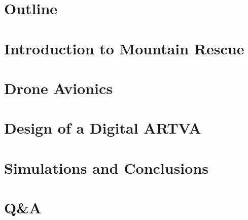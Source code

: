 \documentclass{beamer}
\begin{document}
\section*{Outline}


\section{Introduction to Mountain Rescue}
	\frame{\transitioneffectcommon \centering \tableofcontents[currentsection]}
	
	
	

\section{Drone Avionics}
	\frame{\transitioneffectcommon \centering \tableofcontents[currentsection]}
	
	
		
	
	
	
	

\section{Design of a Digital ARTVA}
	\frame{\transitioneffectcommon \centering \tableofcontents[currentsection]}
	
	
	
	
\section{Simulations and Conclusions}	
	\frame{\transitioneffectcommon \centering \tableofcontents[currentsection]}
	
	
	

\section*{Q\&A}
	
	
	

	
	

	

	
	
\end{document}
